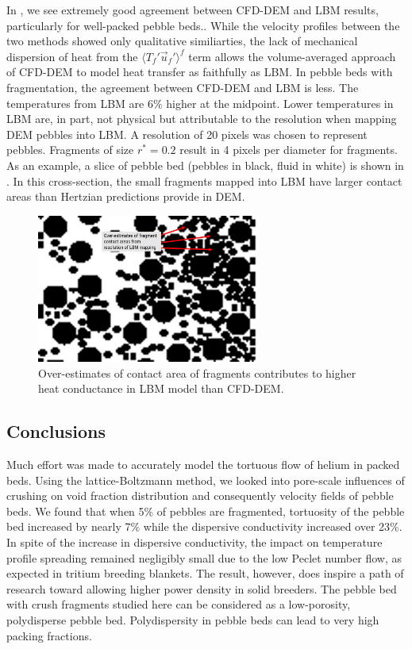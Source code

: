 In , we see extremely good agreement between CFD-DEM and LBM results, particularly for well-packed pebble beds.. While the velocity profiles between the two methods showed only qualitative similiarties, the lack of mechanical dispersion of heat from the $\langle T_f' \vec{u}_f'\rangle^f$ term allows the volume-averaged approach of CFD-DEM to model heat transfer as faithfully as LBM. In pebble beds with fragmentation, the agreement between CFD-DEM and LBM is less. The temperatures from LBM are 6\% higher at the midpoint. Lower temperatures in LBM are, in part, not physical but attributable to the resolution when mapping DEM pebbles into LBM. A resolution of 20 pixels was chosen to represent pebbles. Fragments of size $r^* = 0.2$ result in 4 pixels per diameter for fragments. As an example, a slice of pebble bed (pebbles in black, fluid in white) is shown in . In this cross-section, the small fragments mapped into LBM have larger contact areas than Hertzian predictions provide in DEM. 

\begin{figure}[!t]
    \centering
    \includegraphics[width = 0.65\textwidth]{figures/lbm/fragment-contact-resolution}
    \caption{Over-estimates of contact area of fragments contributes to higher heat conductance in LBM model than CFD-DEM.}\label{fig:lbm-fragment-contact-area}
\end{figure}






\FloatBarrier

\subsection{Conclusions}
Much effort was made to accurately model the tortuous flow of helium in packed beds. Using the lattice-Boltzmann method, we looked into pore-scale influences of crushing on void fraction distribution and consequently velocity fields of pebble beds. We found that when 5\% of pebbles are fragmented, tortuosity of the pebble bed increased by nearly 7\% while the dispersive conductivity increased over 23\%. In spite of the increase in dispersive conductivity, the impact on temperature profile spreading remained negligibly small due to the low Peclet number flow, as expected in tritium breeding blankets. The result, however, does inspire a path of research toward allowing higher power density in solid breeders. The pebble bed with crush fragments studied here can be considered as a low-porosity, polydisperse pebble bed. Polydispersity in pebble beds can lead to very high packing fractions.

